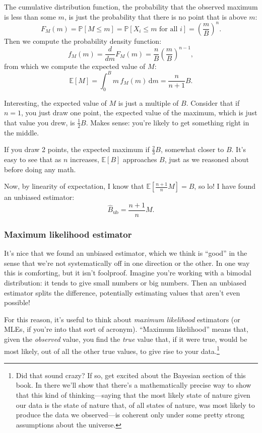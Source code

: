 The cumulative distribution function, the probability that the observed
maximum is less than some \(m\), is just the probability that there is
no point that is above \(m\): \[
F_M(m) = \mathbb{P}[M \leq m] = \mathbb{P}[X_i \leq m \text{ for all } i] = \left( \frac{m}{B} \right)^n.
\] Then we compute the probability density function: \[
f_M(m) = \frac{d}{dm} F_M(m) = \frac{n}{B} \left( \frac{m}{B} \right)^{n-1},
\] from which we compute the expected value of \(M\): \[
\mathbb{E}[M] = \int_0^B m \, f_M(m) \, \mathrm{d}m = \frac{n}{n+1} B.
\]

Interesting, the expected value of \(M\) is just a multiple of \(B\).
Consider that if \(n=1\), you just draw one point, the expected value of
the maximum, which is just that value you drew, is \(\tfrac{1}{2} B\).
Makes sense: you're likely to get something right in the middle.

If you draw 2 points, the expected maximum if \(\tfrac{2}{3}B\),
somewhat closer to \(B\). It's easy to see that as \(n\) increases,
\(\mathbb{E}[B]\) approaches \(B\), just as we reasoned about before
doing any math.

Now, by linearity of expectation, I know that
\(\mathbb{E}\left[\tfrac{n+1}{n} M \right] = B\), so lo! I have found an
unbiased estimator: \[
\hat{B}_\mathrm{ub} = \frac{n+1}{n} M.
\]

\subsubsection{Maximum likelihood
estimator}\label{maximum-likelihood-estimator}

It's nice that we found an unbiased estimator, which we think is
``good'' in the sense that we're not systematically off in one direction
or the other. In one way this is comforting, but it isn't foolproof.
Imagine you're working with a bimodal distribution: it tends to give
small numbers or big numbers. Then an unbiased estimator splits the
difference, potentially estimating values that aren't even possible!

For this reason, it's useful to think about \emph{maximum likelihood}
estimators (or MLEs, if you're into that sort of acronym). ``Maximum
likelihood'' means that, given the \emph{observed} value, you find the
\emph{true} value that, if it were true, would be most likely, out of
all the other true values, to give rise to your data.\footnote{Did that
  sound crazy? If so, get excited about the Bayesian section of this
  book. In there we'll show that there's a mathematically precise way to
  show that this kind of thinking---saying that the most likely state of
  nature given our data is the state of nature that, of all states of
  nature, was most likely to produce the data we observed---is coherent
  only under some pretty strong assumptions about the universe.}

